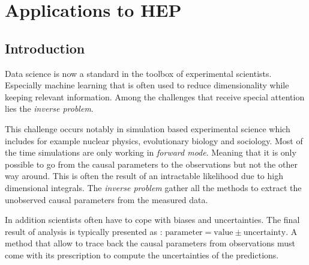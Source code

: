 
\chapter{Applications to HEP}
\label{chap:applications}
\ifpdf
    \graphicspath{{Chapter5/Figs/Raster/}{Chapter5/Figs/PDF/}{Chapter5/Figs/}}
\else
    \graphicspath{{Chapter5/Figs/Vector/}{Chapter5/Figs/}}
\fi




\section{Introduction}


Data science is now a standard in the toolbox of experimental scientists.
Especially machine learning that is often used to reduce dimensionality while keeping relevant information.
Among the challenges that receive special attention lies the \emph{inverse problem}.

This challenge occurs notably in simulation based experimental science which includes for example nuclear physics, evolutionary biology and sociology.
Most of the time simulations are only working in \emph{forward mode}.
Meaning that it is only possible to go from the causal parameters to the observations but not the other way around.
This is often the result of an intractable likelihood due to high dimensional integrals.
The \emph{inverse problem} gather all the methods to extract the unobserved causal parameters from the measured data.

In addition scientists often have to cope with biases and uncertainties.
The final result of analysis is typically presented as : $\text{parameter} = \text{value} \pm \text{uncertainty}$.
A method that allow to trace back the causal parameters from observations must come with its prescription to compute the uncertainties of the predictions.

